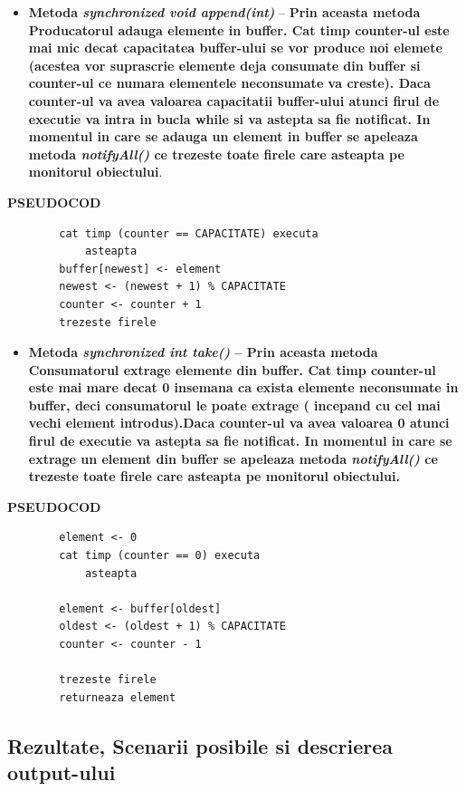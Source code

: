 \documentclass[14pt]{article}
\begin{document}
\begin{itemize}
\item \textbf{Metoda\textit{ synchronized void append(int)} }--\textbf{ Prin aceasta metoda Producatorul adauga elemente in buffer. Cat timp counter-ul este mai mic decat capacitatea buffer-ului se vor produce noi elemete (acestea vor suprascrie elemente deja consumate din buffer si counter-ul ce numara elementele neconsumate va creste). Daca counter-ul va avea valoarea capacitatii buffer-ului atunci firul de executie va intra in bucla while si va astepta sa fie notificat. In momentul in care se adauga un element in buffer se apeleaza metoda\textit{ notifyAll()} ce trezeste toate firele care asteapta pe monitorul obiectului}.
\end{itemize}


 \textbf{PSEUDOCOD}
 \begin{lstlisting}
		cat timp (counter == CAPACITATE) executa
			asteapta
		buffer[newest] <- element
		newest <- (newest + 1) % CAPACITATE
		counter <- counter + 1
		trezeste firele
\end{lstlisting}

\begin{itemize}
\item \textbf{Metoda \textit{synchronized int take()} -- Prin aceasta metoda Consumatorul extrage elemente din buffer. Cat timp counter-ul este mai mare decat 0 insemana ca exista elemente neconsumate in buffer, deci consumatorul le poate extrage ( incepand cu  cel mai vechi element introdus).Daca counter-ul va avea valoarea 0 atunci firul de executie va astepta sa fie notificat. In momentul in care se extrage un element din buffer se apeleaza metoda \textit{notifyAll()} ce trezeste toate firele care asteapta pe monitorul obiectului.}
\end{itemize}


 \textbf{PSEUDOCOD}
 \begin{lstlisting}
	    element <- 0
		cat timp (counter == 0) executa
			asteapta

		element <- buffer[oldest]
		oldest <- (oldest + 1) % CAPACITATE
		counter <- counter - 1
			
		trezeste firele
		returneaza element
\end{lstlisting}

\subsection{Rezultate, Scenarii posibile si descrierea output-ului}
\end{document}
